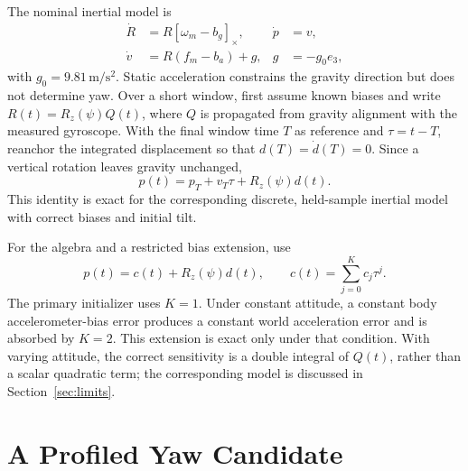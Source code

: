 \documentclass[conference,letterpaper,10pt]{IEEEtran}
\newcommand{\sk}[1]{[#1]_{\times}}
\newcommand{\rz}{R_z}
\begin{document}
The nominal inertial model is
\begin{align}
 \dot R&=R\sk{\omega_m-b_g}, & \dot p&=v,\nonumber\\
 \dot v&=R(f_m-b_a)+g, & g&=-g_0 e_3,
 \label{eq:ins}
\end{align}
with $g_0=9.81\,\mathrm{m/s^2}$. Static acceleration constrains the gravity direction but does not determine yaw. Over a short window, first assume known biases and write $R(t)=\rz(\psi)Q(t)$, where $Q$ is propagated from gravity alignment with the measured gyroscope. With the final window time $T$ as reference and $\tau=t-T$, reanchor the integrated displacement so that $d(T)=\dot d(T)=0$. Since a vertical rotation leaves gravity unchanged,
\begin{equation}
 p(t)=p_T+v_T\tau+\rz(\psi)d(t).
 \label{eq:affine}
\end{equation}
This identity is exact for the corresponding discrete, held-sample inertial model with correct biases and initial tilt.

For the algebra and a restricted bias extension, use
\begin{equation}
 p(t)=c(t)+\rz(\psi)d(t),\qquad
 c(t)=\sum_{j=0}^{K}c_j\tau^j.
 \label{eq:poly}
\end{equation}
The primary initializer uses $K=1$. Under constant attitude, a constant body accelerometer-bias error produces a constant world acceleration error and is absorbed by $K=2$. This extension is exact only under that condition. With varying attitude, the correct sensitivity is a double integral of $Q(t)$, rather than a scalar quadratic term; the corresponding model is discussed in Section~\ref{sec:limits}.

\section{A Profiled Yaw Candidate}
\end{document}
